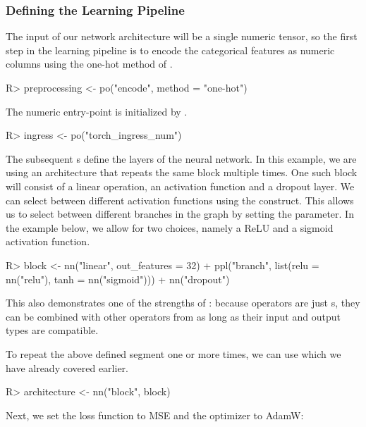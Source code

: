 \documentclass[article]{jss}
\theoremstyle{definition}
\begin{document}
\subsubsection{Defining the Learning Pipeline}
The input of our network architecture will be a single numeric tensor, so the first step in the learning pipeline is to encode the categorical features as numeric columns using the one-hot method of .

\begin{CodeInput}
R> preprocessing <- po("encode", method = "one-hot")
\end{CodeInput}

The numeric entry-point is initialized by .

\begin{CodeInput}
R> ingress <- po("torch_ingress_num")
\end{CodeInput}

The subsequent s define the layers of the neural network.
In this example, we are using an architecture that repeats the same block multiple times.
One such block will consist of a linear operation, an activation function and a dropout layer.
We can select between different activation functions using the  construct.
This allows us to select between different branches in the graph by setting the  parameter.
In the example below, we allow for two choices, namely a ReLU and a sigmoid activation function.

\begin{CodeInput}
R> block <- nn("linear", out_features = 32) %
+    ppl("branch", list(relu = nn("relu"), tanh = nn("sigmoid"))) %
+    nn("dropout")
\end{CodeInput}

This also demonstrates one of the strengths of : because  operators are just s, they can be combined with other operators from  as long as their input and output types are compatible.

To repeat the above defined segment one or more times, we can use  which we have already covered earlier.

\begin{CodeInput}
R> architecture <- nn("block", block)
\end{CodeInput}

Next, we set the loss function to MSE and the optimizer to AdamW:
\end{document}

